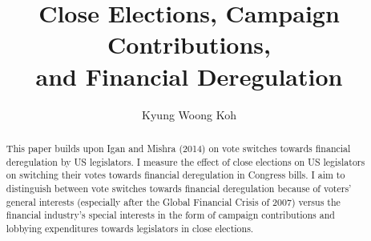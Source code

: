 \documentclass[ProjectKWK]{subfiles}
\begin{document}
\providecommand{\versn}{pdf} %
\ifthenelse{\boolean{Web}}{    %
  \renewcommand{\versn}{Web}     %
  \renewcommand{\rootFromOut}{.} %
}{}  %


\title{Close Elections, Campaign Contributions,\\ and Financial Deregulation}

\author{Kyung Woong Koh\authNum}



\maketitle
\hypertarget{abstract}{}
\begin{abstract}
This paper builds upon Igan and Mishra (2014) \cite{IM14} on vote switches towards financial deregulation by US legislators. I measure the effect of close elections on US legislators on switching their votes towards financial deregulation in Congress bills. I aim to distinguish between vote switches towards financial deregulation because of voters' general interests (especially after the Global Financial Crisis of 2007) versus the financial industry's special interests in the form of campaign contributions and lobbying expenditures towards legislators in close elections.
\end{abstract}


\begin{authorsinfo}
\end{authorsinfo}

\newcommand{\thankstext}{
  The paper is the author's 2nd year paper for fulfillment to the PhD in Economics program at Johns Hopkins University, and also for Professor Christpher Carroll's Computational Methods course. I thank Professors Laurence Ball and Filipe Campante for comments and advice, and Deniz Igan and Prachi MIshra for sharing their data.}
\end{document}
